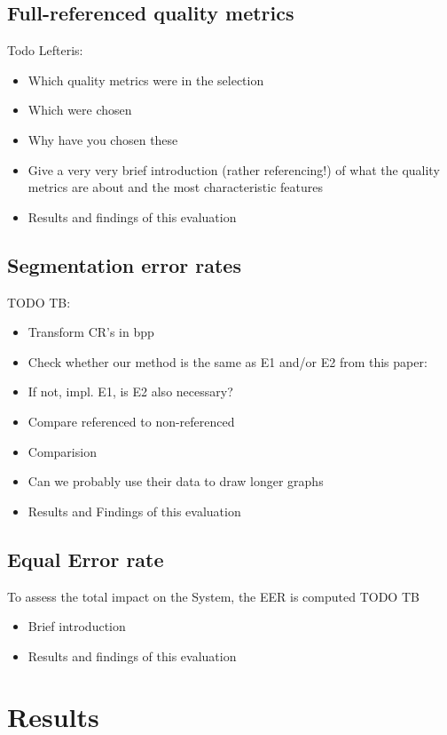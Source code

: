 \documentclass[10pt,twocolumn,letterpaper]{article}
\begin{document}
\subsection{Full-referenced quality metrics}
Todo Lefteris:
\begin{itemize}
 \item Which quality metrics were in the selection
 \item Which were chosen
 \item Why have you chosen these
 \item Give a very very brief introduction (rather referencing!) of what the quality metrics are about and the most characteristic features
 \item Results and findings of this evaluation
\end{itemize}

\subsection{Segmentation error rates}
TODO TB:
\begin{itemize}
 \item Transform CR's in bpp
 \item Check whether our method is the same as E1 and/or E2 from this paper: \cite{severeCompression}
 \item If not, impl. E1, is E2 also necessary?
 \item Compare referenced to non-referenced
 \item Comparision
 \item Can we probably use their data to draw longer graphs
 \item Results and Findings of this evaluation
\end{itemize}


\subsection{Equal Error rate}
To assess the total impact on the System, the EER is computed
TODO TB

\begin{itemize}
 \item Brief introduction
 \item Results and findings of this evaluation
\end{itemize}


\section{Results}
\end{document}
